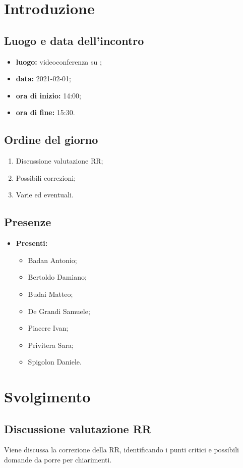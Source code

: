 \section*{Introduzione}
\subsection*{Luogo e data dell'incontro}
\begin{itemize}
	\item \textbf{luogo:} videoconferenza su ;
	\item \textbf{data:} 2021-02-01;
	\item \textbf{ora di inizio:} 14:00;
	\item \textbf{ora di fine:} 15:30.
\end{itemize}

\subsection*{Ordine del giorno}
\begin{enumerate}
	\item Discussione valutazione RR;
	\item Possibili correzioni;
	\item Varie ed eventuali.
\end{enumerate}

\subsection*{Presenze}
\begin{itemize}
	\item \textbf{Presenti:}
	\begin{itemize}
		\item Badan Antonio;
		\item Bertoldo Damiano;
		\item Budai Matteo;
		\item De Grandi Samuele;
		\item Piacere Ivan;
		\item Privitera Sara;
		\item Spigolon Daniele.
	\end{itemize}
\end{itemize}

\section*{Svolgimento}
\subsection*{Discussione valutazione RR}
Viene discussa la correzione della RR, identificando i punti critici e possibili domande da porre per chiarimenti.
